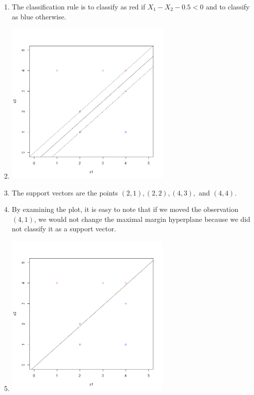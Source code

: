 \documentclass{article}
\begin{document}
\begin{enumerate}
\begin{enumerate}
        \item
        
        The classification rule is to classify as red if $X_1 - X_2 - 0.5 < 0$ and to classify as blue otherwise.
        
        \item
        
        \begin{center}
            \includegraphics[width=8cm]{HW4_6d.png}
        \end{center}
        
        \item
        
        The support vectors are the points $(2, 1), (2, 2), (4, 3), $ and $(4, 4).$
        
        \item
        
        By examining the plot, it is easy to note that if we moved the observation $(4, 1)$, we would not change the maximal margin hyperplane because we did not classify it as a support vector.
        
        \item
        
        \begin{center}
            \includegraphics[width=8cm]{HW4_6g.png}
        \end{center}
        

\end{enumerate}
\end{enumerate}
\end{document}
